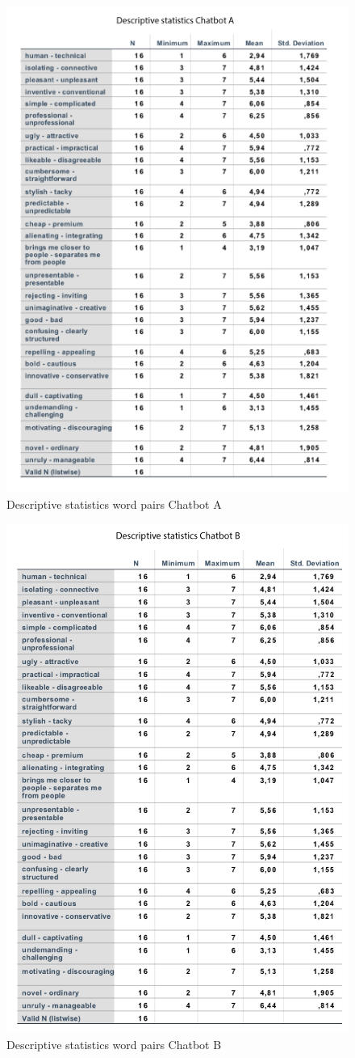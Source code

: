   \begin{figure}[H]
        \centering
        \includegraphics[scale=0.8]{figures/DescriptiveChatbotA.png}
        \caption{Descriptive statistics word pairs Chatbot A}
        \label{fig:deschatA}
    \end{figure}
    
    \begin{figure}[H]
        \centering
        \includegraphics[scale=0.8]{figures/DescriptiveChatbotB.png}
        \caption{Descriptive statistics word pairs Chatbot B}
        \label{fig:deschatB}
    \end{figure}


